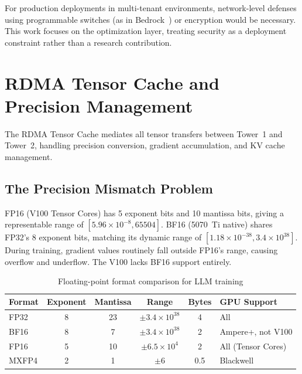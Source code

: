 \documentclass[11pt,letterpaper]{article}
\theoremstyle{definition}
\begin{document}
For production deployments in multi-tenant environments, network-level defenses using programmable switches (as in Bedrock~\cite{bedrock2022}) or encryption would be necessary. This work focuses on the optimization layer, treating security as a deployment constraint rather than a research contribution.

\section{RDMA Tensor Cache and Precision Management}
\label{sec:rdma-cache}

The RDMA Tensor Cache mediates all tensor transfers between Tower~1 and Tower~2, handling precision conversion, gradient accumulation, and KV cache management.

\subsection{The Precision Mismatch Problem}

FP16 (V100 Tensor Cores) has 5 exponent bits and 10 mantissa bits, giving a representable range of $[5.96 \times 10^{-8}, 65504]$. BF16 (5070~Ti native) shares FP32's 8 exponent bits, matching its dynamic range of $[1.18 \times 10^{-38}, 3.4 \times 10^{38}]$. During training, gradient values routinely fall outside FP16's range, causing overflow and underflow. The V100 lacks BF16 support entirely.

\begin{table}[htbp]
\centering
\caption{Floating-point format comparison for LLM training}
\label{tab:fp-comparison}
\begin{tabular}{@{}lccccl@{}}
\toprule
\textbf{Format} & \textbf{Exponent} & \textbf{Mantissa} & \textbf{Range} & \textbf{Bytes} & \textbf{GPU Support} \\
\midrule
FP32 & 8 & 23 & $\pm 3.4 \times 10^{38}$ & 4 & All \\
BF16 & 8 & 7 & $\pm 3.4 \times 10^{38}$ & 2 & Ampere+, not V100 \\
FP16 & 5 & 10 & $\pm 6.5 \times 10^{4}$ & 2 & All (Tensor Cores) \\
MXFP4 & 2 & 1 & $\pm 6$ & 0.5 & Blackwell \\
\bottomrule
\end{tabular}
\end{table}
\end{document}
